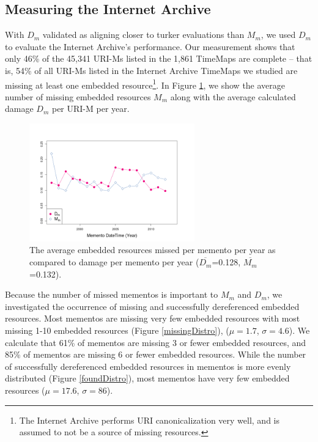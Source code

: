 \subsection{Measuring the Internet Archive}
\label{missing}

With $D_m$ validated as aligning closer to turker evaluations than $M_m$, we used $D_m$ to evaluate the Internet Archive's performance. Our measurement shows that only 46\% of the 45,341 URI-Ms listed in the 1,861 TimeMaps are complete -- that is, 54\% of all URI-Ms listed in the Internet Archive TimeMaps we studied are missing at least one embedded resource\footnote{The Internet Archive performs URI canonicalization very well, and is assumed to not be a source of missing resources.}. In Figure \ref{missingByYear}, we show the average number of missing embedded resources $M_m$ along with the average calculated damage $D_m$ per URI-M per year.


\begin{figure}[h!]
\includegraphics[width=270px]{./imgs/missedAndDamagePerYear.png}
\caption{The average embedded resources missed per memento per year as compared to damage per memento per year ($\overline{D_m}$=0.128, $\overline{M_m}$=0.132).}
\label{missingByYear}
\end{figure}


Because the number of missed mementos is important to $M_m$ and $D_m$, we investigated the occurrence of missing and successfully dereferenced embedded resources. Most mementos are missing very few embedded resources with most missing 1-10 embedded resources (Figure \ref{missingDistro}), ($\mu=1.7$, $\sigma=4.6$). We calculate that 61\% of mementos are missing 3 or fewer embedded resources, and 85\% of mementos are missing 6 or fewer embedded resources. While the number of successfully dereferenced embedded resources in mementos is more evenly distributed (Figure \ref{foundDistro}), most mementos have very few embedded resources ($\mu=17.6$, $\sigma=86$).

